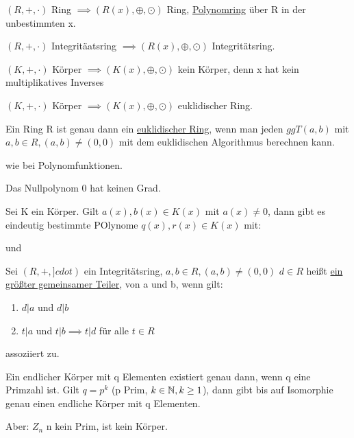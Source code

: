 \documentclass{../tudscript}
\begin{document}
$(R, +, \cdot)$ Ring $\implies (R(x), \oplus, \odot)$ Ring, \underline{Polynomring} über R in der unbestimmten x.

$(R, +, \cdot)$ Integritäatsring $\implies (R(x), \oplus, \odot)$ Integritätsring.

$(K, +, \cdot)$ Körper $\implies (K(x), \oplus, \odot)$ kein Körper, denn x hat kein multiplikatives Inverses

$(K, +, \cdot)$ Körper $\implies (K(x), \oplus, \odot)$ euklidischer Ring.

Ein Ring R ist genau dann ein \underline{euklidischer Ring}, wenn man jeden $ggT(a, b)$ mit $a, b \in R, (a, b) \neq (0,0)$ mit dem
euklidischen Algorithmus berechnen kann.

wie bei Polynomfunktionen.

Das Nullpolynom 0 hat keinen Grad.

Sei K ein Körper.
Gilt $a(x), b(x) \in K(x)$ mit $a(x) \neq 0$, dann gibt es eindeutig bestimmte POlynome $q(x), r(x) \in K(x)$ mit:

und



Sei $(R, +, ]cdot)$ ein Integritätsring, $a, b \in R, (a, b) \neq (0, 0)$
$d \in R$ heißt \underline{ein größter gemeinsamer Teiler}, von a und b, wenn gilt:
\begin{enumerate}
  \item $d|a$ und $d|b$
  \item $t|a$ und $t|b \implies t|d$ für alle $t \in R$
\end{enumerate}
  assoziiert zu.

Ein endlicher Körper mit q Elementen existiert genau dann,
wenn q eine Primzahl ist. Gilt $q = p^k$ (p Prim, $k \in \mathbb{N}, k \geq 1$), dann gibt bis auf Isomorphie genau einen endliche Körper mit q Elementen.

Aber: $Z_n$ n kein Prim, ist kein Körper.
\end{document}
